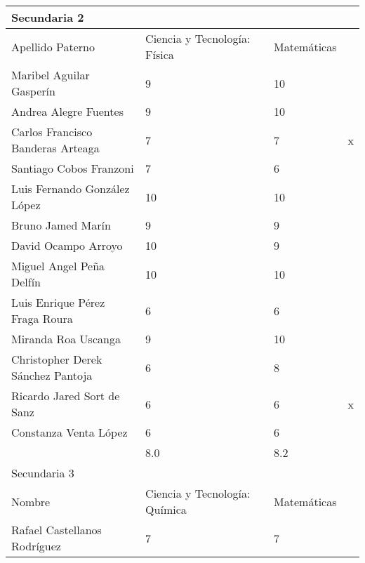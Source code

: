 \begin{tabular}{lllll}
    Secundaria 2                      &                               &  &             &   \\\hline
    Apellido Paterno                  & Ciencia y Tecnología: Física  &  & Matemáticas &   \\\hline
    Maribel Aguilar Gasperín          & 9                             &  & 10          &   \\\hline
    Andrea Alegre Fuentes             & 9                             &  & 10          &   \\\hline
    Carlos Francisco Banderas Arteaga & 7                             &  & 7           & x \\\hline
    Santiago Cobos Franzoni           & 7                             &  & 6           &   \\\hline
    Luis Fernando González López      & 10                            &  & 10          &   \\\hline
    Bruno Jamed Marín                 & 9                             &  & 9           &   \\\hline
    David Ocampo Arroyo               & 10                            &  & 9           &   \\\hline
    Miguel Angel Peña Delfín          & 10                            &  & 10          &   \\\hline
    Luis Enrique Pérez Fraga Roura    & 6                             &  & 6           &   \\\hline
    Miranda Roa Uscanga               & 9                             &  & 10          &   \\\hline
    Christopher Derek Sánchez Pantoja & 6                             &  & 8           &   \\\hline
    Ricardo Jared Sort de Sanz        & 6                             &  & 6           & x \\\hline
    Constanza Venta López             & 6                             &  & 6           &   \\\hline
                                      & 8.0                           &  & 8.2         &   \\\hline
    Secundaria 3                      &                               &  &             &   \\\hline
    Nombre                            & Ciencia y Tecnología: Química &  & Matemáticas &   \\\hline
    Rafael Castellanos Rodríguez      & 7                             &  & 7           &   \\\hline

\end{tabular}

